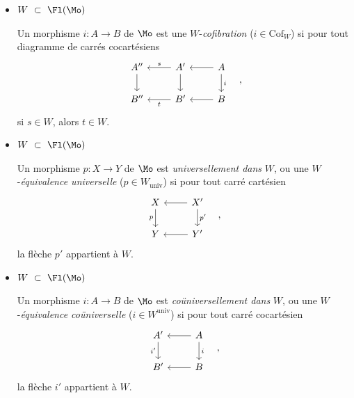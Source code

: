 \begin{itemize}
\item[\textbullet] $W \ \subset\ \Fl(\Mo)$

Un morphisme $i : A \longrightarrow B$ de $\Mo$ est une $W$-\textit{cofibration} ($i \in \mathrm{Cof}_W$) si pour tout diagramme de carrés cocartésiens
\[
\begin{tikzcd}
A'' \arrow[d] & A' \arrow[l, "s"'] \arrow[d] & A \arrow[l] \arrow[d, "i"] \\
B'' & B' \arrow[l, "t"] & B \arrow[l]
\end{tikzcd}
\quad ,
\]
si $s \in W$, alors $t \in W$.

\item[\textbullet] $W \ \subset\ \Fl(\Mo)$

Un morphisme $p : X \longrightarrow Y$ de $\Mo$ est \textit{universellement dans} $W$, ou une $W$-\textit{équivalence universelle} ($p \in W_{\mathrm{univ}}$) si pour tout carré cartésien
\[
\begin{tikzcd}
X \arrow[d, "p"'] & X' \arrow[l] \arrow[d, "p'"] \\
Y & Y' \arrow[l]
\end{tikzcd}
\quad ,
\]
la flèche $p'$ appartient à $W$.

\item[\textbullet] $W \ \subset\ \Fl(\Mo)$

Un morphisme $i : A \longrightarrow B$ de $\Mo$ est \textit{coüniversellement dans} $W$, ou une $W$-\textit{équivalence coüniverselle} ($i \in W^{\mathrm{univ}}$) si pour tout carré cocartésien
\[
\begin{tikzcd}
A' \arrow[d, "i'"'] & A \arrow[l] \arrow[d, "i"] \\
B' & B \arrow[l]
\end{tikzcd}
\quad ,
\]
la flèche $i'$ appartient à $W$.
\end{itemize}


